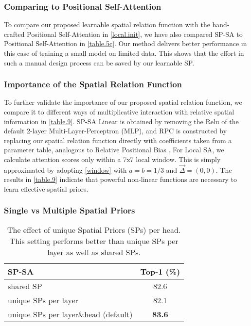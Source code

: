 \documentclass[authorversion, sigconf, acmthm=false, nonacm=true]{acmart}
\begin{document}
\subsubsection{Comparing to Positional Self-Attention}
To compare our proposed learnable spatial relation function with the hand-crafted Positional Self-Attention \cite{d'ascoli2021convit} in \cref{local.init},
we have also compared SP-SA to Positional Self-Attention in \cref{table.5c}. Our method delivers better performance in this case of training a small model on limited data.
This shows that the effort in such a manual design process can be saved by our learnable SP.





\subsubsection{Importance of the Spatial Relation Function}
To further validate the importance of our proposed spatial relation function, we compare it to different ways of multiplicative interaction
with relative spatial information in \cref{table.9}. SP-SA Linear is obtained by removing the Relu of the default 2-layer Multi-Layer-Perceptron (MLP), 
and RPC is constructed by replacing our spatial relation function directly with coefficients taken from a parameter table, analogous to Relative Positional Bias \cite{liu2021swin}. 
For Local SA, we calculate attention scores only within a 7x7 local window. 
This is simply approximated by adopting \cref{window} with $a=b=1/3$ and $\vec{\Delta}=(0,0)$.
The results in \cref{table.9} indicate that powerful non-linear functions are necessary to learn
effective spatial priors. 





\subsubsection{Single vs Multiple Spatial Priors}

\begin{table}[h]
  \caption{The effect of unique Spatial Priors (SPs) per head. This setting performs better than unique SPs per layer as well as shared SPs.
  }
  \centering
\begin{tabular}{lc}
     \toprule
     SP-SA &  Top-1 (\%)    \\
     \midrule
    shared SP            &   82.6 \\
     unique SPs per layer &   82.1 \\
     
unique SPs per layer\&head (default) &  \textbf{83.6} \\
\bottomrule
  \end{tabular}
\label{table7}
  \end{table}
\end{document}

